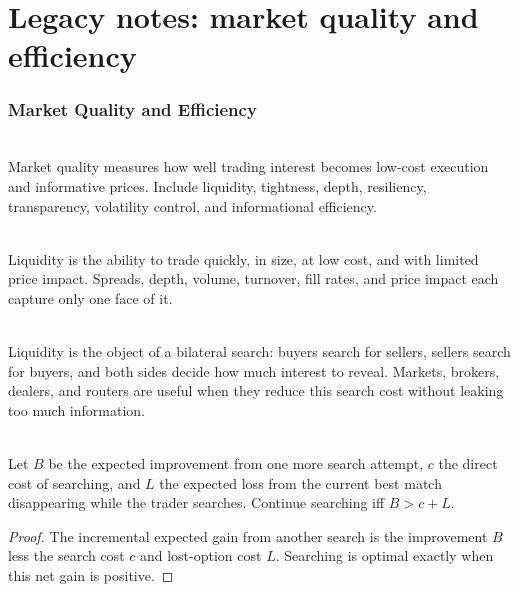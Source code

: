 \documentclass[a4paper,oneside,openany]{book}
\begin{document}
\chapter*{Legacy notes: market quality and efficiency}

\subsection*{Market Quality and Efficiency}

\begin{definition} \\
Market quality measures how well trading interest becomes low-cost execution and informative prices. Include liquidity, tightness, depth, resiliency, transparency, volatility control, and informational efficiency.
\end{definition}

\begin{definition} \\
Liquidity is the ability to trade quickly, in size, at low cost, and with limited price impact. Spreads, depth, volume, turnover, fill rates, and price impact each capture only one face of it.
\end{definition}

\begin{mechanism} \\
Liquidity is the object of a bilateral search: buyers search for sellers, sellers search for buyers, and both sides decide how much interest to reveal. Markets, brokers, dealers, and routers are useful when they reduce this search cost without leaking too much information.
\end{mechanism}

\begin{proposition} \\
Let $B$ be the expected improvement from one more search attempt, $c$ the direct cost of searching, and $L$ the expected loss from the current best match disappearing while the trader searches. Continue searching iff $B>c+L$.
\begin{proof}
The incremental expected gain from another search is the improvement $B$ less the search cost $c$ and lost-option cost $L$. Searching is optimal exactly when this net gain is positive.
\end{proof}
\end{proposition}
\end{document}
